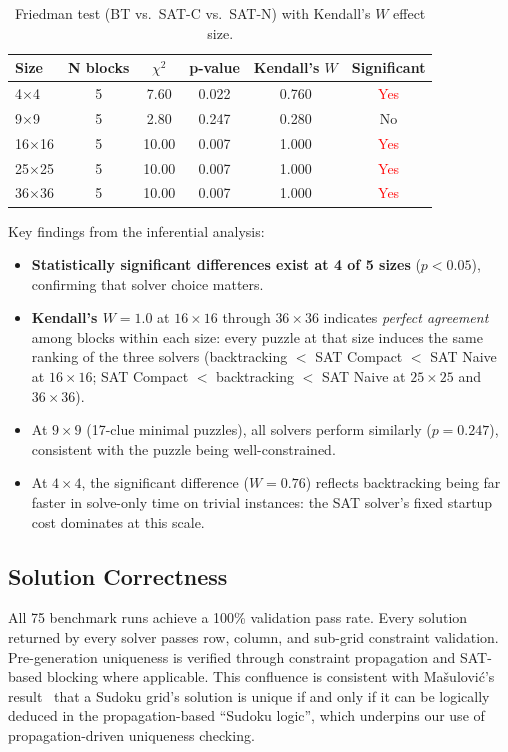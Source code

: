 \documentclass[12pt]{article}
\begin{document}
\begin{table}[htbp]
\centering
\caption{Friedman test (BT vs.\ SAT-C vs.\ SAT-N) with Kendall's $W$ effect size.}
\label{tab:friedman}
\begin{tabular}{lccccc}
\toprule
\textbf{Size} & \textbf{N blocks} & \textbf{$\chi^2$} & \textbf{p-value} & \textbf{Kendall's $W$} & \textbf{Significant} \\
\midrule
4$\times$4    & 5 & 7.60  & 0.022 & 0.760 & \textcolor{red}{Yes} \\
9$\times$9    & 5 & 2.80  & 0.247 & 0.280 & No \\
16$\times$16  & 5 & 10.00 & 0.007 & 1.000 & \textcolor{red}{Yes} \\
25$\times$25  & 5 & 10.00 & 0.007 & 1.000 & \textcolor{red}{Yes} \\
36$\times$36  & 5 & 10.00 & 0.007 & 1.000 & \textcolor{red}{Yes} \\
\bottomrule
\end{tabular}
\end{table}

Key findings from the inferential analysis:
\begin{itemize}
    \item \textbf{Statistically significant differences exist at 4 of 5 sizes} ($p < 0.05$), confirming that solver choice matters.
    \item \textbf{Kendall's $W = 1.0$} at $16\times16$ through $36\times36$ indicates \emph{perfect agreement} among blocks within each size: every puzzle at that size induces the same ranking of the three solvers (backtracking $<$ SAT Compact $<$ SAT Naive at $16\times16$; SAT Compact $<$ backtracking $<$ SAT Naive at $25\times25$ and $36\times36$).
    \item At $9\times9$ (17-clue minimal puzzles), all solvers perform similarly ($p = 0.247$), consistent with the puzzle being well-constrained.
    \item At $4\times4$, the significant difference ($W = 0.76$) reflects backtracking being far faster in solve-only time on trivial instances: the SAT solver's fixed startup cost dominates at this scale.
\end{itemize}


\subsection{Solution Correctness}

All 75 benchmark runs achieve a 100\% validation pass rate. Every solution returned by every solver passes row, column, and sub-grid constraint validation. Pre-generation uniqueness is verified through constraint propagation and SAT-based blocking where applicable. This confluence is consistent with Mašulović's result~\citep{Masulovic2022} that a Sudoku grid's solution is unique if and only if it can be logically deduced in the propagation-based ``Sudoku logic'', which underpins our use of propagation-driven uniqueness checking.
\end{document}
